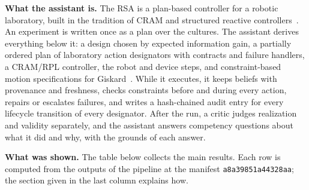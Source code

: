 \documentclass[10pt,a4paper]{article}
\begin{document}
\textbf{What the assistant is.} The RSA is a plan-based controller for a robotic laboratory, built in the tradition of CRAM and structured reactive controllers~\citep{mcdermott1991,beetz2001,beetz2010}. An experiment is written once as a plan over the cultures. The assistant derives everything below it: a design chosen by expected information gain, a partially ordered plan of laboratory action designators with contracts and failure handlers, a CRAM/RPL controller, the robot and device steps, and constraint-based motion specifications for Giskard~\citep{stelter2022}. While it executes, it keeps beliefs with provenance and freshness, checks constraints before and during every action, repairs or escalates failures, and writes a hash-chained audit entry for every lifecycle transition of every designator. After the run, a critic judges realization and validity separately, and the assistant answers competency questions about what it did and why, with the grounds of each answer.

\textbf{What was shown.} The table below collects the main results. Each row is computed from the outputs of the pipeline at the manifest \texttt{a8a39851a44328aa}; the section given in the last column explains how.
\end{document}
